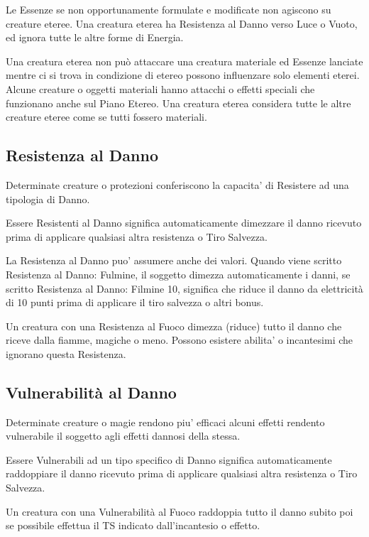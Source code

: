 \documentclass[a4paper,11pt,twoside,openany]{book}
\begin{document}
Le Essenze se non opportunamente formulate e modificate non agiscono su creature eteree. Una creatura eterea ha Resistenza al Danno verso Luce o Vuoto, ed ignora tutte le altre forme di Energia.

Una creatura eterea non può attaccare una creatura materiale ed Essenze lanciate mentre ci si trova in condizione di etereo possono influenzare solo elementi eterei. Alcune creature o oggetti materiali hanno attacchi o effetti speciali che funzionano anche sul Piano Etereo. Una creatura eterea considera tutte le altre creature eteree come se tutti fossero materiali.

\subsection{Resistenza al Danno}

Determinate creature o protezioni conferiscono la capacita' di Resistere ad una tipologia di Danno.

Essere Resistenti al Danno significa automaticamente dimezzare il danno ricevuto prima di applicare qualsiasi altra resistenza o Tiro Salvezza.

La Resistenza al Danno puo' assumere anche dei valori. Quando viene scritto Resistenza al Danno: Fulmine, il soggetto dimezza automaticamente i danni, se scritto Resistenza al Danno: Filmine 10, significa che riduce il danno da elettricità di 10 punti prima di applicare il tiro salvezza o altri bonus.

Un creatura con una Resistenza al Fuoco dimezza (riduce) tutto il danno che riceve dalla fiamme, magiche o meno. Possono esistere abilita' o incantesimi che ignorano questa Resistenza.



\subsection{Vulnerabilità al Danno}

Determinate creature o magie rendono piu' efficaci alcuni effetti rendento vulnerabile il soggetto agli effetti dannosi della stessa.

Essere Vulnerabili ad un tipo specifico di Danno significa automaticamente raddoppiare il danno ricevuto prima di applicare qualsiasi altra resistenza o Tiro Salvezza.

Un creatura con una Vulnerabilità al Fuoco raddoppia tutto il danno subito poi se possibile effettua il TS indicato dall'incantesio o effetto.
\end{document}
